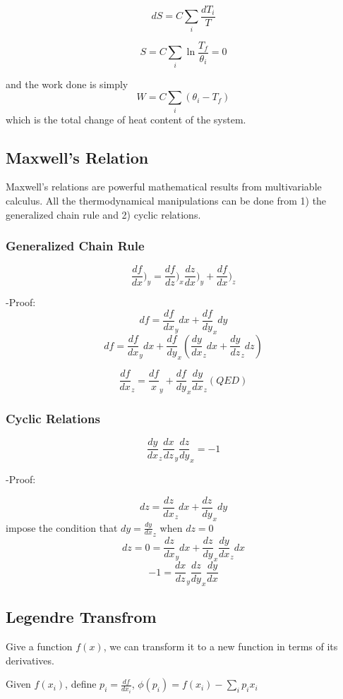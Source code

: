 \documentclass[12pt, oneside]{article}   	%
\begin{document}
$$dS = C \sum_i \frac{dT_i}{T}$$

$$S = C \sum_i \ln \frac{T_f}{\theta_i} = 0  $$ 

and the work done is simply $$W = C \sum_i (\theta_i - T_f)$$ which is the total change of heat content of the system. 


\par 
\subsection{Maxwell's Relation}
Maxwell's relations are powerful mathematical results from multivariable calculus. All the thermodynamical manipulations can be done from 1) the generalized chain rule and 2) cyclic relations. 

\subsubsection*{Generalized Chain Rule}
$$ \frac{d f}{d x})_y=\frac{d f}{d z})_x \frac{d z}{d x} )_y+\frac{d f}{d x}) _z$$

-Proof: 
$$df = \frac{d f} {dx}_y dx + \frac{d f} {dy}_x dy$$
$$df = \frac{d f} {dx}_y dx + \frac{d f} {dy}_x (\frac{dy}{dx}_z dx + \frac{dy}{dz}_z dz)$$ 

$$\frac{df}{dx}_z = \frac{df}{x}_y + \frac{df}{dy}_x \frac{dy}{dx}_z (QED)$$ 

\subsubsection*{Cyclic Relations}
$$\frac{dy}{dx}_z \frac{dx}{dz}_y \frac{dz}{dy}_x = -1$$

-Proof:

$$dz = \frac{dz}{dx}_z dx + \frac{dz}{dy}_x dy$$
impose the condition that $dy = \frac{dy}{dx}_z $ when $dz = 0 $
$$dz = 0 = \frac{dz}{dx}_y dx + \frac{dz}{dy}_x \frac{dy}{dx}_z dx$$
$$-1 = \frac{dx}{dz}_y \frac{dz}{dy}_x \frac{dy}{dx}$$

\subsection{Legendre Transfrom} 
\par 

Give a function $f(x)$, we can transform it to a new function in terms of its derivatives. 

Given $f({x_i})$, define $p_i = \frac{d f}{dx_i}$, $\phi({p_i}) = f({x_i}) - \sum_i p_i x_i$
\end{document}
